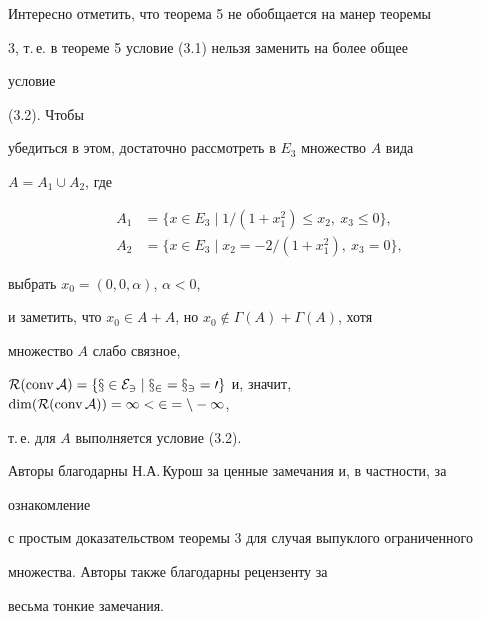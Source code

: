  


\begin{notenonum} 


Интересно отметить, что теорема 5 не обобщается на манер теоремы 


3, т.\,е. в теореме 5 условие (3.1) нельзя заменить на более общее 


условие 


(3.2). Чтобы 


убедиться в этом, достаточно рассмотреть в $E_3$ множество $A$ вида 


$A=A_1\cup A_2$, где 


\begin{align*} 


A_1&=\{x\in E_3\mid 1/(1+x^2_1)\le x_2,\ x_3\le0\},\\ 


A_2&=\{x\in E_3\mid x_2=-2/(1+x^2_1),\ x_3=0\}, 


\end{align*} 


выбрать $x_0=(0,0,\alpha)$, $\alpha<0$,


и заметить, что $x_0\in A+A$, но $x_0\notin\Gamma(A)+\Gamma(A)$, хотя 


множество $A$ слабо связное, 


$\cal R(\conv A)=\{x\in E_3\mid x_2=x_3=0\}$ и, значит, $\dim(\cal 


R(\conv A))=1<2=n-1$,


т.\,е. для $A$ выполняется условие (3.2). 


\end{notenonum} 


 


Авторы благодарны Н.А.\,Курош за ценные замечания и, в частности, за 


ознакомление 


с простым доказательством теоремы 3 для случая выпуклого ограниченного 


множества. Авторы также благодарны рецензенту за


весьма тонкие замечания.


 


 


